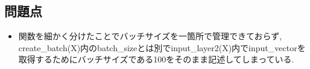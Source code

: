 \documentclass[a4j, titlepage]{jarticle}
\begin{document}
\subsection*{問題点}
    \begin{itemize}
        \item 関数を細かく分けたことでバッチサイズを一箇所で管理できておらず, create\_batch(X)内のbatch\_sizeとは別でinput\_layer2(X)内でinput\_vectorを取得するためにバッチサイズである100をそのまま記述してしまっている.
    \end{itemize}
\end{document}
